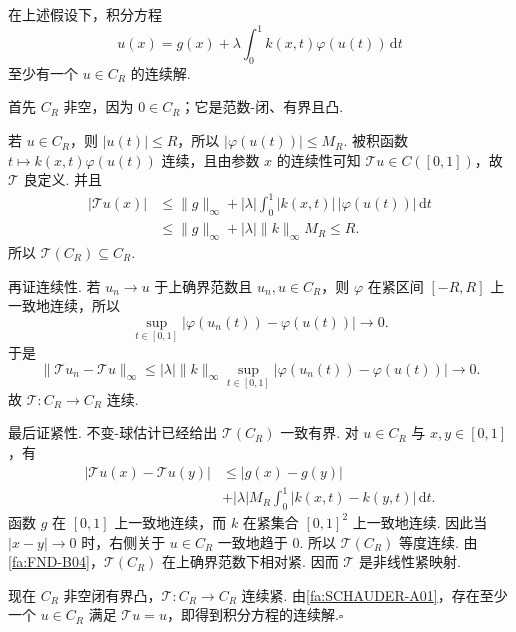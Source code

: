 \begin{FAApplication}
在上述假设下，积分方程
\[
u(x)
=
g(x)
+
\lambda\int_0^1k(x,t)\varphi(u(t))\,\mathrm{d}t
\]
至少有一个 \(\displaystyle u\in C_R\) 的连续解.
\end{FAApplication}

\begin{FAProof}
首先 \(\displaystyle C_R\) 非空，因为 \(\displaystyle0\in C_R\)；它是范数-闭、有界且凸.

若 \(\displaystyle u\in C_R\)，则 \(\displaystyle |u(t)|\leqslant R\)，所以 \(\displaystyle |\varphi(u(t))|\leqslant M_R\). 被积函数 \(\displaystyle t\mapsto k(x,t)\varphi(u(t))\) 连续，且由参数 \(\displaystyle x\) 的连续性可知 \(\displaystyle \mathcal T u\in C([0,1])\)，故 \(\displaystyle \mathcal T\) 良定义. 并且
\[
\begin{aligned}
|\mathcal T u(x)|
&\leqslant
\|g\|_\infty
+
|\lambda|\int_0^1|k(x,t)|\,|\varphi(u(t))|\,\mathrm{d}t\\
&\leqslant
\|g\|_\infty
+
|\lambda|\|k\|_\infty M_R
\leqslant
R.
\end{aligned}
\]
所以 \(\displaystyle \mathcal T(C_R)\subseteq C_R\).

再证连续性. 若 \(\displaystyle u_n\to u\) 于上确界范数且 \(\displaystyle u_n,u\in C_R\)，则 \(\displaystyle \varphi\) 在紧区间 \(\displaystyle[-R,R]\) 上一致地连续，所以
\[
\sup_{t\in[0,1]}|\varphi(u_n(t))-\varphi(u(t))|
\longrightarrow0.
\]
于是
\[
\|\mathcal T u_n-\mathcal T u\|_\infty
\leqslant
|\lambda|\|k\|_\infty
\sup_{t\in[0,1]}|\varphi(u_n(t))-\varphi(u(t))|
\longrightarrow0.
\]
故 \(\displaystyle \mathcal T:C_R\to C_R\) 连续.

最后证紧性. 不变-球估计已经给出 \(\displaystyle \mathcal T(C_R)\) 一致有界. 对 \(\displaystyle u\in C_R\) 与 \(\displaystyle x,y\in[0,1]\)，有
\[
\begin{aligned}
|\mathcal T u(x)-\mathcal T u(y)|
&\leqslant
|g(x)-g(y)|\\
&\mathrel{+}
|\lambda|M_R\int_0^1|k(x,t)-k(y,t)|\,\mathrm{d}t.
\end{aligned}
\]
函数 \(\displaystyle g\) 在 \(\displaystyle[0,1]\) 上一致地连续，而 \(\displaystyle k\) 在紧集合 \(\displaystyle[0,1]^2\) 上一致地连续. 因此当 \(\displaystyle |x-y|\to0\) 时，右侧关于 \(\displaystyle u\in C_R\) 一致地趋于 \(\displaystyle0\). 所以 \(\displaystyle \mathcal T(C_R)\) 等度连续. 由\autoref{fa:FND-B04}，\(\displaystyle \mathcal T(C_R)\) 在上确界范数下相对紧. 因而 \(\displaystyle \mathcal T\) 是非线性紧映射.

现在 \(\displaystyle C_R\) 非空闭有界凸，\(\displaystyle \mathcal T:C_R\to C_R\) 连续紧. 由\autoref{fa:SCHAUDER-A01}，存在至少一个 \(\displaystyle u\in C_R\) 满足 \(\displaystyle \mathcal T u=u\)，即得到积分方程的连续解.\hfill\(\square\)

\end{FAProof}

